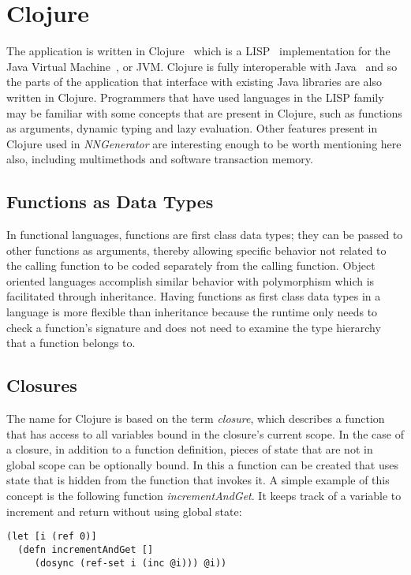 \section{Clojure}
The application is written in Clojure~\cite{clj} which is a LISP~\cite{lisp} implementation for the Java Virtual Machine~\cite{jvm}, or JVM. 
Clojure is fully interoperable with Java~\cite{java} and so the parts of the application that interface with existing Java libraries are also written in Clojure.
Programmers that have used languages in the LISP family may be familiar with some concepts that are present in Clojure, such as
functions as arguments, dynamic typing and lazy evaluation. 
Other features present in Clojure used in {\em NNGenerator} are interesting enough to be worth mentioning here also, including multimethods and software transaction memory.

\subsection{Functions as Data Types}
In functional languages, functions are first class data types; they
can be passed to other functions as arguments, thereby allowing specific behavior not related to the calling function to be coded
separately from the calling function. 
Object oriented languages accomplish similar behavior with polymorphism which is
facilitated through inheritance. 
Having functions as first class data types in a language is more
flexible than inheritance because the runtime only needs to check a
function's signature and does not need to examine the type hierarchy
that a function belongs to.   

\subsection{Closures}
The name for Clojure is based on the term {\it closure}, which
describes a function that has access to all variables bound in the
closure's current scope. 
In the case of a closure, in addition to a function definition, pieces
of state that are not in global scope can be optionally bound. 
In this a function can be created that uses state that is hidden
from the function that invokes it.
A simple example of this concept is the following function {\it incrementAndGet}.
It keeps track of a variable to increment and return without using
global state: 

\lstset{language=Clojure}
\begin{lstlisting}
(let [i (ref 0)]
  (defn incrementAndGet []
     (dosync (ref-set i (inc @i))) @i))
\end{lstlisting}

